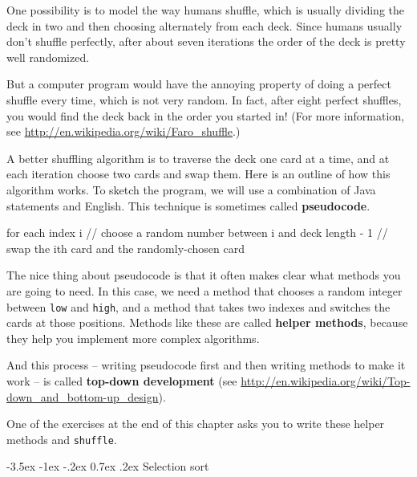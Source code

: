 \documentclass[12pt]{book}
\makeatletter
\theoremstyle{exercise}
\newcommand{\java}[1]{\verb"#1"}
\renewcommand{\section}{\@startsection{section}{1}{\z@}%
    {-3.5ex \@plus -1ex \@minus -.2ex}%
    {0.7ex \@plus.2ex}%
    {\normalfont\Large\bfseries}}
\newcommand{\java}[1]{\lstinline{#1}} %
\makeatother
\begin{document}
One possibility is to model the way humans shuffle, which is usually dividing the deck in two and then choosing alternately from each deck.
Since humans usually don't shuffle perfectly, after about seven iterations the order of the deck is pretty well randomized.

But a computer program would have the annoying property of doing a perfect shuffle every time, which is not very random.
In fact, after eight perfect shuffles, you would find the deck back in the order you started in!
(For more information, see \url{http://en.wikipedia.org/wiki/Faro_shuffle}.)


A better shuffling algorithm is to traverse the deck one card at a time, and at each iteration choose two cards and swap them.
Here is an outline of how this algorithm works.
To sketch the program, we will use a combination of Java statements and English.
This technique is sometimes called {\bf pseudocode}.

\begin{code}
    for each index i {
        // choose a random number between i and deck length - 1
        // swap the ith card and the randomly-chosen card
    }
\end{code}

The nice thing about pseudocode is that it often makes clear what methods you are going to need.
In this case, we need a method that chooses a random integer between \java{low} and \java{high}, and a method that takes two indexes and switches the cards at those positions.
Methods like these are called {\bf helper methods}, because they help you implement more complex algorithms. 


And this process -- writing pseudocode first and then writing methods to make it work -- is called {\bf top-down development} (see \url{http://en.wikipedia.org/wiki/Top-down_and_bottom-up_design}).


One of the exercises at the end of this chapter asks you to write these helper methods and \java{shuffle}.


\section{Selection sort}
\label{sorting}

\end{document}
